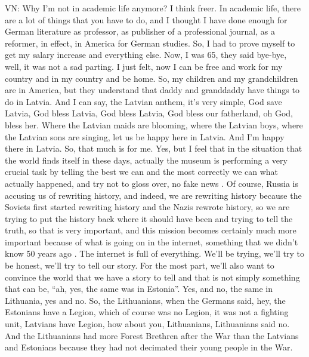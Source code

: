 VN: Why I'm not in academic life anymore? I think freer. In academic life, there are a lot of things that you have to do, and I thought I have done enough for German literature as professor, as publisher of a professional journal, as a reformer, in effect, in America for German studies. So, I had to prove myself to get my salary increase and everything else. Now, I was 65, they said bye-bye, well, it was not a sad parting. I just felt, now I can be free and work for my country and in my country and be home. So, my children and my grandchildren are in America, but they understand that daddy and granddaddy have things to do in Latvia. And I can say, the Latvian anthem, it’s very simple, God save Latvia, God bless Latvia, God bless Latvia, God bless our fatherland, oh God, bless her. Where the Latvian maids are blooming, where the Latvian boys, where the Latvian sons are singing, let us be happy here in Latvia. And I'm happy there in Latvia. So, that much is for me. Yes, but I feel that in the situation that the world finds itself in these days, actually the museum is performing a very crucial task by telling the best we can and the most correctly we can what actually happened, and try not to gloss over, no fake news . Of course, Russia is accusing us of rewriting history, and indeed, we are rewriting history because the Soviets first started rewriting history and the Nazis rewrote history, so we are trying to put the history back where it should have been and trying to tell the truth, so that is very important, and this mission becomes certainly much more important because of what is going on in the internet, something that we didn’t know 50 years ago . The internet is full of everything. We’ll be trying, we’ll try to be honest, we’ll try to tell our story. For the most part, we’ll also want to convince the world that we have a story to tell and that is not simply something that can be, “ah, yes, the same was in Estonia”. Yes, and no, the same in Lithuania, yes and no. So, the Lithuanians, when the Germans said, hey, the Estonians have a Legion, which of course was no Legion, it was not a fighting unit, Latvians have Legion, how about you, Lithuanians, Lithuanians said no. And the Lithuanians had more Forest Brethren after the War than the Latvians and Estonians because they had not decimated their young people in the War. 

